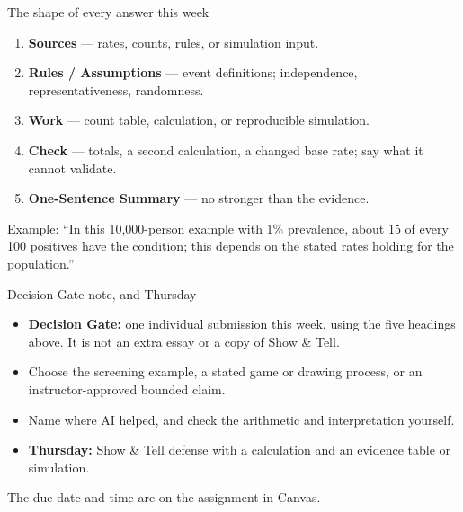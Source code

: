 \documentclass[aspectratio=169,10pt]{beamer}
\begin{document}
\begin{frame}{The shape of every answer this week}
\begin{enumerate}
\item \textbf{Sources} --- rates, counts, rules, or simulation input.
\item \textbf{Rules / Assumptions} --- event definitions; independence, representativeness, randomness.
\item \textbf{Work} --- count table, calculation, or reproducible simulation.
\item \textbf{Check} --- totals, a second calculation, a changed base rate; say what it cannot validate.
\item \textbf{One-Sentence Summary} --- no stronger than the evidence.
\end{enumerate}
\vspace{1mm}
\small Example: ``In this 10{,}000-person example with 1\% prevalence, about 15 of every 100 positives have the condition; this depends on the stated rates holding for the population.''
\end{frame}

\begin{frame}{Decision Gate note, and Thursday}
\begin{itemize}
\item \textbf{Decision Gate:} one individual submission this week, using the five headings above. It is not an extra essay or a copy of Show \& Tell.
\item Choose the screening example, a stated game or drawing process, or an instructor-approved bounded claim.
\item Name where AI helped, and check the arithmetic and interpretation yourself.
\item \textbf{Thursday:} Show \& Tell defense with a calculation and an evidence table or simulation.
\end{itemize}
\small The due date and time are on the assignment in Canvas.
\end{frame}
\end{document}
